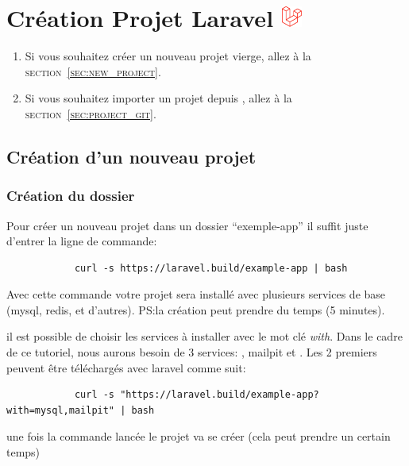 \section[Création Projet Laravel]{Création Projet Laravel \includegraphics[height=20pt]{figures-logos/laravel.pdf}}

\begin{enumerate}
    \item Si vous souhaitez créer un nouveau projet vierge, allez à la \textsc{section~\ref{sec:new_project}}.
    \item Si vous souhaitez importer un projet depuis \github{}, allez à la \textsc{section~\ref{sec:project_git}}.
\end{enumerate}

\subsection[Création d'un nouveau projet]{Création d'un nouveau projet\label{sec:new_project}}
    \subsubsection[Création du dossier]{Création du dossier}
        Pour créer un nouveau projet \laravel{} dans un dossier ``exemple-app'' il suffit juste d'entrer la ligne de commande:

        \begin{lstlisting}
            curl -s https://laravel.build/example-app | bash
        \end{lstlisting}

        Avec cette commande votre projet sera installé avec plusieurs services de base (mysql, redis, et d'autres). PS:la création peut prendre du temps (5 minutes).

        il est possible de choisir les services à installer avec le mot clé \textit{with}. Dans le cadre de ce tutoriel, nous aurons besoin de 3 services: \mysql, mailpit et \phpmyadmin. Les 2 premiers peuvent être téléchargés avec laravel comme suit:

        \begin{lstlisting}
            curl -s "https://laravel.build/example-app?with=mysql,mailpit" | bash
        \end{lstlisting}

        une fois la commande lancée le projet va se créer (cela peut prendre un certain temps)

